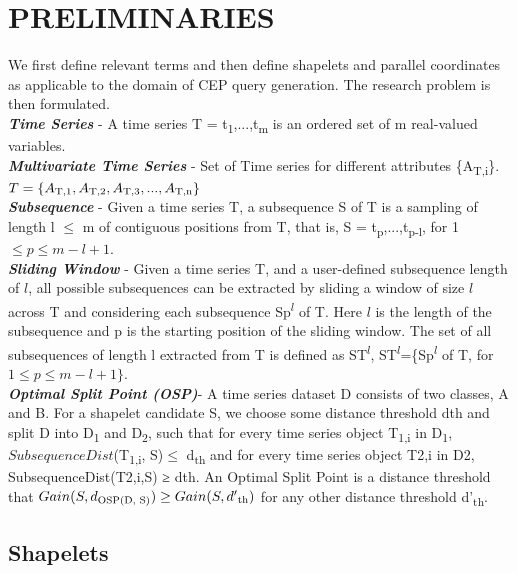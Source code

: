 \documentclass[letterpaper, 10 pt, conference]{IEEEtran}  %
\begin{document}
\section{PRELIMINARIES}
We first define relevant terms and then define shapelets and parallel coordinates as applicable to the domain of CEP query generation. The research problem is then formulated.
\medskip\\
\textbf{\textit{Time Series}} - A time series T = t\textsubscript{1},...,t\textsubscript{m} is an ordered set of m real-valued variables.
\smallskip\\
\textbf{\textit{Multivariate Time Series}} - Set of Time series for different attributes \{A\textsubscript{T,i}\}. \(T = \{A\textsubscript{T,1},A\textsubscript{T,2},A\textsubscript{T,3},...,A\textsubscript{T,n}\}\)
\smallskip\\
\textbf{\textit{Subsequence}} - Given a time series T, a subsequence S of T is a sampling of length l \(\leq\) m of contiguous positions from T, that is, S = t\textsubscript{p},...,t\textsubscript{p-l}, for 1 \(\leq p \leq m - l + 1\).
\smallskip\\
\textbf{\textit{Sliding Window}} - Given a time series T, and a user-defined subsequence length of \(l\), all possible subsequences can be extracted by sliding a window of size  \(l\) across T and considering each subsequence Sp\textsuperscript{\(l\)} of T. Here \(l\) is the length of the subsequence and p is the starting position of the sliding window. The set of all subsequences of length l extracted from T is defined as ST\textsuperscript{\(l\)}, ST\textsuperscript{\(l\)}=\{Sp\textsuperscript{\(l\)} of T, for \(1 \leq p \leq m - l + 1\}\).
\smallskip\\
\textbf{\textit{Optimal Split Point (OSP)}}- A time series dataset D consists of two classes, A and B. For a shapelet candidate S, we choose some distance threshold dth and split D into D\textsubscript{1} and D\textsubscript{2}, such that for every time series object T\textsubscript{1,i} in D\textsubscript{1}, \(SubsequenceDist\)(T\textsubscript{1,i}, S)\(\leq\) d\textsubscript{th} and for every time series object T2,i in D2, SubsequenceDist(T2,i,S) ≥ dth. An Optimal Split Point is a distance threshold that \(Gain(S, d\textsubscript{OSP(D, S)}) \geq Gain(S, d'\textsubscript{th})\) for any other distance threshold d'\textsubscript{th}.

\subsection{Shapelets}
\end{document}
